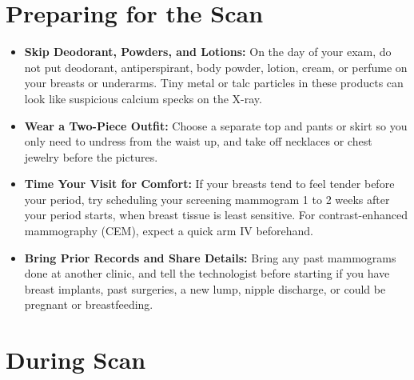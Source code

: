 \section{Preparing for the Scan}

\begin{itemize}
    \item \textbf{Skip Deodorant, Powders, and Lotions:} On the day of your exam, do not put deodorant, antiperspirant, body powder, lotion, cream, or perfume on your breasts or underarms. Tiny metal or talc particles in these products can look like suspicious calcium specks on the X-ray.
    \item \textbf{Wear a Two-Piece Outfit:} Choose a separate top and pants or skirt so you only need to undress from the waist up, and take off necklaces or chest jewelry before the pictures.
    \item \textbf{Time Your Visit for Comfort:} If your breasts tend to feel tender before your period, try scheduling your screening mammogram 1 to 2 weeks after your period starts, when breast tissue is least sensitive. For contrast-enhanced mammography (CEM), expect a quick arm IV beforehand.
    \item \textbf{Bring Prior Records and Share Details:} Bring any past mammograms done at another clinic, and tell the technologist before starting if you have breast implants, past surgeries, a new lump, nipple discharge, or could be pregnant or breastfeeding.
\end{itemize}

\section{During Scan}


